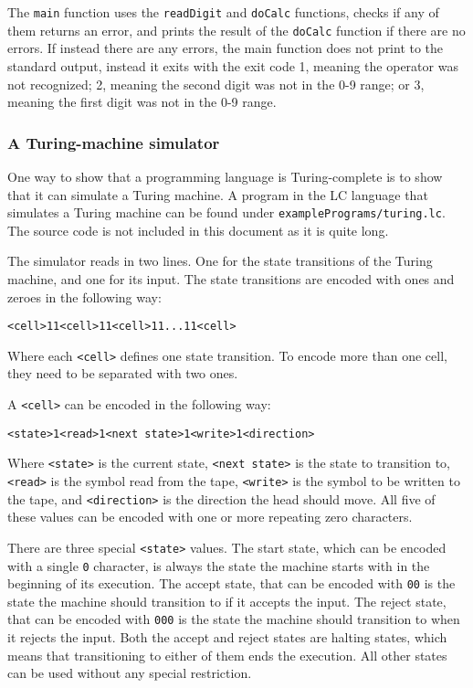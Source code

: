 \documentclass[12pt]{article}
\begin{document}
The \verb$main$ function uses the \verb$readDigit$ and \verb$doCalc$ functions,
checks if any of them returns an error, and prints the result of the
\verb$doCalc$ function if there are no errors. If instead there are any errors,
the main function does not print to the standard output, instead it exits with
the exit code 1, meaning the operator was not recognized; 2, meaning the second
digit was not in the 0-9 range; or 3, meaning the first digit was not in the 0-9
range.

\subsubsection{A Turing-machine simulator}

One way to show that a programming language is Turing-complete is to show that
it can simulate a Turing machine. A program in the LC language that simulates a
Turing machine can be found under \verb$examplePrograms/turing.lc$. The source
code is not included in this document as it is quite long.

The simulator reads in two lines. One for the state transitions of the Turing
machine, and one for its input. The state transitions are encoded with ones and
zeroes in the following way:
\lstset{frame=none}
\lstset{numbers=none}
\begin{lstlisting}
<cell>11<cell>11<cell>11...11<cell>
\end{lstlisting}
Where each \verb$<cell>$ defines one state transition. To encode more than one
cell, they need to be separated with two ones.

A \verb$<cell>$ can be encoded in the following way:
\begin{lstlisting}
<state>1<read>1<next state>1<write>1<direction>
\end{lstlisting}
Where \verb$<state>$ is the current state, \verb$<next state>$ is the state to
transition to, \verb$<read>$ is the symbol read from the tape, \verb$<write>$ is
the symbol to be written to the tape, and \verb$<direction>$ is the direction
the head should move. All five of these values can be encoded with one or more
repeating zero characters.

There are three special \verb$<state>$ values. The start state, which can be
encoded with a single \verb$0$ character, is always the state the machine starts
with in the beginning of its execution. The accept state, that can be encoded
with \verb$00$ is the state the machine should transition to if it accepts the
input. The reject state, that can be encoded with \verb$000$ is the state the
machine should transition to when it rejects the input. Both the accept and
reject states are halting states, which means that transitioning to either of
them ends the execution. All other states can be used without any special 
restriction.
\end{document}
